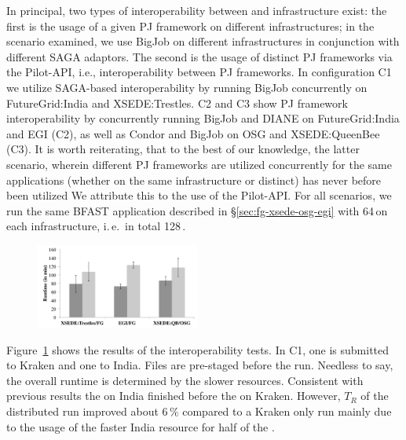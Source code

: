 \documentclass[conference]{IEEEtran}
\begin{document}
In principal, two types of interoperability between \pilotjobs and
infrastructure exist: the first is the usage of a given PJ framework
on different infrastructures; in the scenario examined, we use BigJob
on different infrastructures in conjunction with different SAGA
adaptors. The second is the usage of distinct PJ frameworks via the
Pilot-API, i.e., interoperability between PJ frameworks. In
configuration C1 we utilize SAGA-based interoperability by running
BigJob concurrently on FutureGrid:India and XSEDE:Trestles. C2 and C3
show PJ framework interoperability by concurrently running BigJob and
DIANE on FutureGrid:India and EGI (C2), as well as Condor and BigJob
on OSG and XSEDE:QueenBee (C3). It is worth reiterating, that to the
best of our knowledge, the latter scenario, wherein different PJ
frameworks are utilized concurrently for the same applications
(whether on the same infrastructure or distinct) has never before been
utilized We attribute this to the use of the Pilot-API.  For all
scenarios, we run the same BFAST application described in
\S\ref{sec:fg-xsede-osg-egi} with 64\,\cus on each infrastructure,
i.\,e.\ in total 128\,\cus.

\begin{figure}[htbp]
  	\centering
	\includegraphics[width=0.48\textwidth]{../perf/interop/128-bfast-interop-with-staging.pdf}
	\caption{}
	\label{fig:perf_interop_128-bfast-interop}
\end{figure}


Figure~\ref{fig:perf_interop_128-bfast-interop} shows the results of
the interoperability tests. In C1, one \pilot is submitted to Kraken
and one to India.  Files are pre-staged before the
run. Needless to say, the overall runtime is determined by the slower
resources. Consistent with previous results the \pilot on India
finished before the \pilot on Kraken. However, $T_R$ of the
distributed run improved about 6\,\% compared to a Kraken only run
mainly due to the usage of the faster India resource for half of the
\cus.
\end{document}

